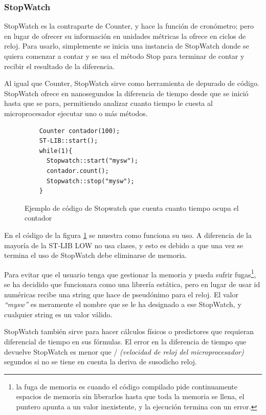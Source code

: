 \documentclass{report}
\begin{document}
\subsubsection{StopWatch}
StopWatch es la contraparte de Counter, y hace la función de cronómetro; pero en lugar de ofrecer su información en unidades métricas la ofrece en ciclos de reloj. Para usarlo, simplemente se inicia una instancia de StopWatch donde se quiera comenzar a contar y se usa el método Stop para terminar de contar y recibir el resultado de la diferencia. 
\par \vspace{0.3cm}
Al igual que Counter, StopWatch sirve como herramienta de depurado de código. StopWatch ofrece en nanosegundos la diferencia de tiempo desde que se inició hasta que se para, permitiendo analizar cuanto tiempo le cuesta al microprocesador ejecutar uno o más métodos. 
\begin{figure}[h]
  \begin{lstlisting}
    Counter contador(100);
    ST-LIB::start();
    while(1){
      Stopwatch::start("mysw");
      contador.count();
      Stopwatch::stop("mysw");
    }
  \end{lstlisting}
  \caption{Ejemplo de código de Stopwatch que cuenta cuanto tiempo ocupa el contador}
  \label{StopWatchCode}
\end{figure}
\par \vspace{0.3cm}
En el código de la figura \ref{StopWatchCode} se muestra como funciona su uso. A diferencia de la mayoría de la ST-LIB LOW no usa clases, y esto es debido a que una vez se termina el uso de StopWatch debe eliminarse de memoria. \par 
Para evitar que el usuario tenga que gestionar la memoria y pueda sufrir fugas\footnote{la fuga de memoria es cuando el código compilado pide continuamente espacios de memoria sin liberarlos hasta que toda la memoria se llena, el puntero apunta a un valor inexistente, y la ejecución termina con un error.}, se ha decidido que funcionara como una librería estática, pero en lugar de usar id numéricas recibe una string que hace de pseudónimo para el reloj. El valor \textit{``mysw''} es meramente el nombre que se le ha designado a ese StopWatch, y cualquier string es un valor válido.
\par \vspace{0.3cm}
StopWatch también sirve para hacer cálculos físicos o predictores que requieran diferencial de tiempo en sus fórmulas. El error en la diferencia de tiempo que devuelve StopWatch es menor que  / \textit{(velocidad de reloj del microprocesador)} segundos si no se tiene en cuenta la deriva de susodicho reloj.  
\end{document}
